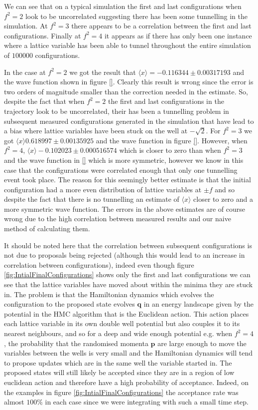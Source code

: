 \documentclass[12pt]{article}
\begin{document}
                

        We can see that on a typical simulation the first and last configurations when $f^2=2$ look to be uncorrelated suggesting there has been some tunnelling in the simulation. At $f^2=3$ there appears to be a correlation between the first and last configurations. Finally at $f^2=4$ it appears as if there has only been one instance where a lattice variable has been able to tunnel throughout the entire simulation of $100000$ configurations.

        In the case at $f^2=2$ we got the result that $\langle x \rangle = -0.116344 \pm 0.00317193$ and the wave function shown in figure \ref{}. Clearly this result is wrong since the error is two orders of magnitude smaller than the correction needed in the estimate. So, despite the fact that when $f^2=2$ the first and last configurations in the trajectory look to be uncorrelated, their has been a tunnelling problem in subsequent measured configurations generated in the simulation that have lead to a bias where lattice variables have been stuck on the well at $-\sqrt{2}$. For $f^2=3$ we got $\langle x \rangle 0.618997 \pm 0.00135925$ and the wave function in figure \ref{}. However, when $f^2=4$,  $\langle x \rangle -0.102023 \pm 0.000516574$ which is closer to zero than when $f^2=3$ and the wave function in \ref{} which is more symmetric, however we know in this case that the configurations were correlated enough that only one tunnelling event took place. The reason for this seemingly better estimate is that the initial configuration had a more even distribution of lattice variables at $\pm f$ and so despite the fact that there is no tunnelling an estimate of $\langle x \rangle$ closer to zero and a more symmetric wave function. The errors in the above estimates are of course wrong due to the high correlation between measured results and our naive method of calculating them. 

        It should be noted here that the correlation between subsequent configurations is not due to proposals being rejected (although this would lead to an increase in correlation between configurations), indeed even though figure \ref{fig:IntialFinalConfigurations} shows only the first and last configurations we can see that the lattice variables have moved about within the minima they are stuck in. The problem is that the Hamiltonian dynamics which evolves the configuration to the proposed state evolves $\bm{q}$ in an energy landscape given by the potential in the HMC algorithm that is the Euclidean action. This action places each lattice variable in its own double well potential but also couples it to its nearest neighbours, and so for a deep and wide enough potential e.g. when $f^2=4$, the probability that the randomised momenta $\bm{p}$ are large enough to move the variables between the wells is very small and the Hamiltonian dynamics will tend to propose updates which are in the same well the variable started in. The proposed states will still likely be accepted since they are in a region of low euclidean action and therefore have a high probability of acceptance. Indeed, on the examples in figure \ref{fig:IntialFinalConfigurations} the acceptance rate was almost $100\%$ in each case since we were integrating with such a small time step.
\end{document}

